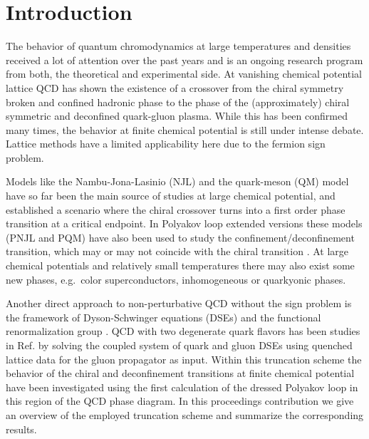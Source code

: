\documentclass[a4paper,fleqn]{cls/cas-dc}
\begin{document}
\section{Introduction}

The behavior of quantum chromodynamics at large temperatures and densities received a lot of attention over the past
years and is an ongoing research program from both, the theoretical and experimental side. At vanishing chemical potential
lattice QCD has shown the existence of a crossover from the chiral symmetry broken and confined hadronic phase to the
phase of the (approximately) chiral symmetric and deconfined quark-gluon plasma. While this has been confirmed many
times, the behavior at finite chemical potential is still under intense debate. Lattice methods have a limited applicability
here due to the fermion sign problem.

Models like the Nambu-Jona-Lasinio (NJL) and the quark-meson (QM) model have so far been the main source of
studies at large chemical potential, and established a scenario where the chiral crossover turns into a first order phase
transition at a critical endpoint. In Polyakov loop extended versions these models (PNJL and PQM) have also been used to
study the confinement/deconfinement transition, which may or may not coincide with the chiral transition \cite{HERBST201158,PhysRevD.73.014019,PhysRevD074023,PhysRevC.83.054904}. At large
chemical potentials and relatively small temperatures there may also exist some new phases, e.g.\ color superconductors,
inhomogeneous \cite{KOJO201037,PhysRevLett.103.072301} or quarkyonic \cite{MCLERRAN200783} phases.

Another direct approach to non-perturbative QCD without the sign problem is the framework of Dyson-Schwinger
equations (DSEs) \cite{PhysRevLett.103.052003,FISCHER2011438,Fischer2010} and the functional renormalization group \cite{BRAUN2010262,PhysRevLett.106.022002}. QCD with two degenerate quark flavors has
been studies in Ref. \cite{FISCHER2011438} by solving the coupled system of quark and gluon DSEs using quenched lattice data for the gluon
propagator as input. Within this truncation scheme the behavior of the chiral and deconfinement transitions at finite
chemical potential have been investigated using the first calculation of the dressed Polyakov loop in this region of the QCD 
phase diagram. In this proceedings contribution we give an overview of the employed truncation scheme and summarize
the corresponding results.
\end{document}
